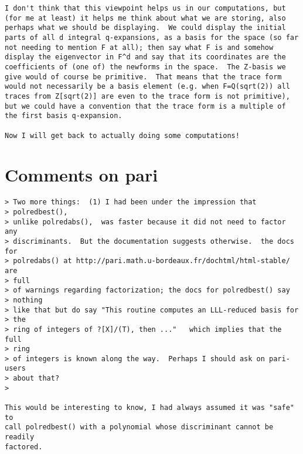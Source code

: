\documentclass[11pt]{amsart}
\numberwithin{equation}{subsection}
\theoremstyle{definition}
\begin{document}
\begin{verbatim}
I don't think that this viewpoint helps us in our computations, but (for me at least) it helps me think about what we are storing, also perhaps what we should be displaying.  We could display the initial parts of all d integral q-expansions, as a basis for the space (so far not needing to mention F at all); then say what F is and somehow display the eigenvector in F^d and say that its coordinates are the coefficients of (one of) the newforms in the space.  The Z-basis we give would of course be primitive.  That means that the trace form would not necessarily be a basis element (e.g. when F=Q(sqrt(2)) all traces from Z[sqrt(2)] are even to the trace form is not primitive), but we could have a convention that the trace form is a multiple of the first basis q-expansion.

Now I will get back to actually doing some computations!
\end{verbatim}

\section{Comments on pari}

\begin{verbatim}
> Two more things:  (1) I had been under the impression that 
> polredbest(),
> unlike polredabs(),  was faster because it did not need to factor any
> discriminants.  But the documentation suggests otherwise.  the docs for
> polredabs() at http://pari.math.u-bordeaux.fr/dochtml/html-stable/ are 
> full
> of warnings regarding factorization; the docs for polredbest() say 
> nothing
> like that but do say "This routine computes an LLL-reduced basis for 
> the
> ring of integers of ?[X]/(T), then ..."   which implies that the full 
> ring
> of integers is known along the way.  Perhaps I should ask on pari-users
> about that?
> 

This would be interesting to know, I had always assumed it was "safe" to
call polredbest() with a polynomial whose discriminant cannot be readily
factored.
\end{verbatim}

\begin{thebibliography}{999}

\end{thebibliography}
\end{document}
